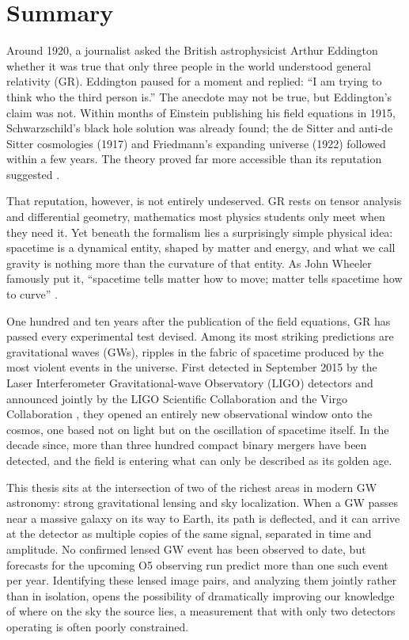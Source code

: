 \chapter*{\textbf{Summary}}
{}

Around 1920, a journalist asked the British astrophysicist Arthur Eddington whether it was true that only three people in the world understood general relativity (GR). Eddington paused for a moment and replied: ``I am trying to think who the third person is.'' The anecdote may not be true, but Eddington's claim was not. Within months of Einstein publishing his field equations in 1915, Schwarzschild's black hole solution was already found; the de Sitter and anti-de Sitter cosmologies (1917) and Friedmann's expanding universe (1922) followed within a few years. The theory proved far more accessible than its reputation suggested \cite{LlibreBertJanssen}.

That reputation, however, is not entirely undeserved. GR rests on tensor analysis and differential geometry, mathematics most physics students only meet when they need it. Yet beneath the formalism lies a surprisingly simple physical idea: spacetime is a dynamical entity, shaped by matter and energy, and what we call gravity is nothing more than the curvature of that entity. As John Wheeler famously put it, ``spacetime tells matter how to move; matter tells spacetime how to curve'' \cite{WheelerFord1998}.

One hundred and ten years after the publication of the field equations, GR has passed every experimental test devised. Among its most striking predictions are gravitational waves (GWs), ripples in the fabric of spacetime produced by the most violent events in the universe. First detected in September 2015 by the Laser Interferometer Gravitational-wave Observatory (LIGO) detectors and announced jointly by the LIGO Scientific Collaboration and the Virgo Collaboration \cite{GW150914}, they opened an entirely new observational window onto the cosmos, one based not on light but on the oscillation of spacetime itself. In the decade since, more than three hundred compact binary mergers have been detected, and the field is entering what can only be described as its golden age.

This thesis sits at the intersection of two of the richest areas in modern GW astronomy: strong gravitational lensing and sky localization. When a GW passes near a massive galaxy on its way to Earth, its path is deflected, and it can arrive at the detector as multiple copies of the same signal, separated in time and amplitude. No confirmed lensed GW event has been observed to date, but forecasts for the upcoming O5 observing run predict more than one such event per year. Identifying these lensed image pairs, and analyzing them jointly rather than in isolation, opens the possibility of dramatically improving our knowledge of where on the sky the source lies, a measurement that with only two detectors operating is often poorly constrained.


